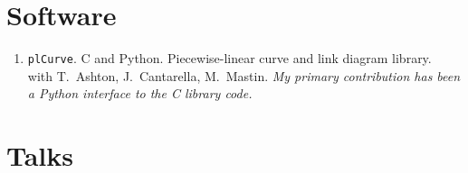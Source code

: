\documentclass[letterpaper]{article}
\begin{document}
\section*{Software}

\begin{enumerate}
\item \texttt{plCurve}. C and Python. Piecewise-linear curve and link diagram library.\\
  with T.\ Ashton, J.\ Cantarella, M.\ Mastin.
  \textit{My primary contribution has been a Python interface to the C
  library code.}
\end{enumerate}

\section*{Talks}
\end{document}
